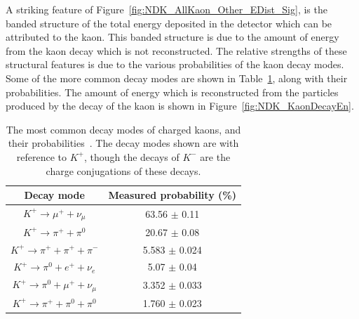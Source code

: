 A striking feature of Figure~\ref{fig:NDK_AllKaon_Other_EDist_Sig}, is the banded structure of the total energy deposited in the detector which can be attributed to the kaon. This banded structure is due to the amount of energy from the kaon decay which is not reconstructed. The relative strengths of these structural features is due to the various probabilities of the kaon decay modes. Some of the more common decay modes are shown in Table~\ref{tab:NDK_KaonDecayRat}, along with their probabilities. The amount of energy which is reconstructed from the particles produced by the decay of the kaon is shown in Figure~\ref{fig:NDK_KaonDecayEn}. \\

\begin{table}[h!]
  \caption[The most common decay modes of charged kaons, and their probabilities]
          {The most common decay modes of charged kaons, and their probabilities~\citep{PDGReview}. The decay modes shown are with reference to $K^{+}$, though the decays of $K^{-}$ are the charge conjugations of these decays.}
  \centering
  \label{tab:NDK_KaonDecayRat}
  \begin{tabular}{c c}
    \toprule
        {Decay mode}                                      & {Measured probability (\%)} \\
        \midrule
        $K^{+} \rightarrow \mu^{+} + \nu_{\mu}$           & 63.56 $\pm$ 0.11 \\

        $K^{+} \rightarrow \pi^{+} + \pi^{0}$             & 20.67 $\pm$ 0.08 \\

        $K^{+} \rightarrow \pi^{+} + \pi^{+} + \pi^{-}$   & 5.583 $\pm$ 0.024 \\

        $K^{+} \rightarrow \pi^{0} + e^{+} + \nu_{e}$     & 5.07 $\pm$ 0.04 \\

        $K^{+} \rightarrow \pi^{0} + \mu^{+} + \nu_{\mu}$ & 3.352 $\pm$ 0.033 \\

        $K^{+} \rightarrow \pi^{+} + \pi^{0} + \pi^{0}$   & 1.760 $\pm$ 0.023 \\
        \bottomrule
  \end{tabular}
\end{table}

